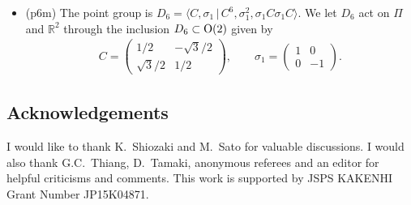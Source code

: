 \documentclass[pdftex]{sigma}
\theoremstyle{definition}
\newcommand{\R}{\mathbb{R}}
\begin{document}
\begin{itemize}
\item
(\textsf{p6m})
The point group is $D_6 = \langle C, \sigma_1 \,|\, C^6, \sigma_1^2, \sigma_1C\sigma_1C \rangle$. We let $D_6$ act on $\Pi$ and $\R^2$ through the inclusion $D_6 \subset {\rm O}(2)$ given by
\begin{gather*}
C =
\left(
\begin{matrix}
1/2 & -\sqrt{3}/2 \\
\sqrt{3}/2 & 1/2
\end{matrix}
\right), \qquad
\sigma_1 =
\left(
\begin{matrix}
1 & 0 \\
0 & -1
\end{matrix}
\right).
\end{gather*}
\end{itemize}

\subsection*{Acknowledgements}

I would like to thank K.~Shiozaki and M.~Sato for valuable discussions. I would also thank G.C.~Thiang, D.~Tamaki, anonymous referees and an editor for helpful criticisms and comments. This work is supported by JSPS KAKENHI Grant Number JP15K04871.
\end{document}

